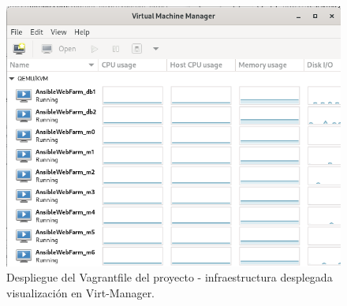 \begin{figure}[H]
	\centering
	\includegraphics[scale=0.35]{img/vagrant8}
	\caption{Despliegue del Vagrantfile del proyecto - infraestructura desplegada visualización en Virt-Manager.}
\end{figure}










%





